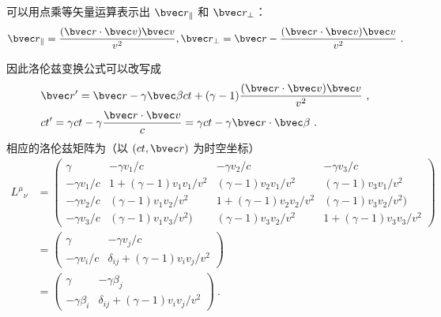 可以用点乘等矢量运算表示出 $\bvec r_\parallel$ 和 $\bvec r_\perp$：
\begin{equation}
\bvec r_{\parallel}=\frac{(\bvec r\cdot \bvec v)\bvec v}{v^2},\bvec r_{\perp}=\bvec r-\frac{(\bvec r\cdot \bvec v)\bvec v}{v^2}~.
\end{equation}

因此洛伦兹变换公式可以改写成
\begin{equation}
\begin{aligned}
&\bvec r'=\bvec r-\gamma\bvec \beta ct+(\gamma-1)\frac{(\bvec r\cdot \bvec v)\bvec v}{v^2}~,\\
&ct'=\gamma ct-\gamma\frac{\bvec r\cdot\bvec v}{c}=\gamma ct-\gamma \bvec r\cdot\bvec \beta~.
\end{aligned}
\end{equation}
相应的洛伦兹矩阵为（以 $(ct,\bvec r)$ 为时空坐标）
\begin{equation}\label{eq_SRLrtz_6}
\begin{aligned}
{L^\mu}_\nu&=
\left(\begin{matrix}
\gamma& -\gamma v_1/c & -\gamma v_2/c& -\gamma v_3/c\\
-\gamma v_1/c&1+(\gamma-1)v_1v_1/v^2& (\gamma-1)v_2v_1/v^2&(\gamma-1)v_3v_1/v^2\\
-\gamma v_2/c &(\gamma-1)v_1v_2/v^2&1+(\gamma-1)v_2v_2/v^2&(\gamma-1)v_3v_2/v^2)\\
-\gamma v_3/c&(\gamma-1)v_1v_3/v^2)&(\gamma-1)v_3v_2/v^2&1+(\gamma-1)v_3v_3/v^2
\end{matrix}\right)\\
&=\left(\begin{matrix}
\gamma & -\gamma v_j/c \\
-\gamma v_i/c & \delta_{ij}+(\gamma-1)v_iv_j/v^2
\end{matrix}
\right)\\
&=\left(\begin{matrix}
\gamma & -\gamma \beta_j \\
-\gamma \beta_i & \delta_{ij}+(\gamma-1)v_iv_j/v^2
\end{matrix}
\right)~.
\end{aligned}
\end{equation}

